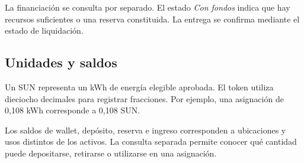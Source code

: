 La financiación se consulta por separado. El estado \textit{Con fondos} indica que hay recursos suficientes o una reserva constituida. La entrega se confirma mediante el estado de liquidación.

\subsection{Unidades y saldos}
Un SUN representa un kWh de energía elegible aprobada. El token utiliza dieciocho decimales para registrar fracciones. Por ejemplo, una asignación de 0,108 kWh corresponde a 0,108 SUN.

Los saldos de wallet, depósito, reserva e ingreso corresponden a ubicaciones y usos distintos de los activos. La consulta separada permite conocer qué cantidad puede depositarse, retirarse o utilizarse en una asignación.
